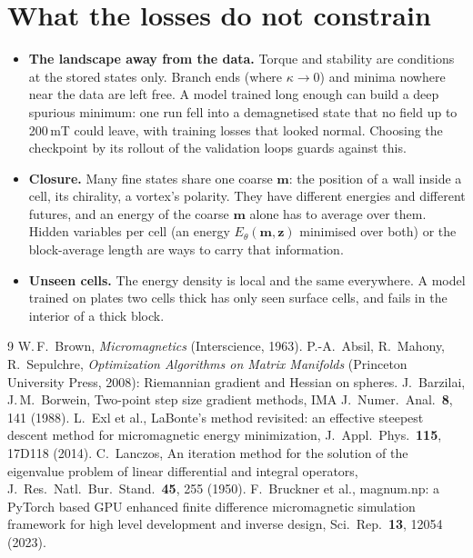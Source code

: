 \documentclass[11pt,a4paper]{article}
\newcommand{\m}{\bm{m}}
\begin{document}
\section{What the losses do not constrain}
\label{sec:limits}

\begin{itemize}
  \item \textbf{The landscape away from the data.} Torque and stability are conditions at the stored
        states only. Branch ends (where $\kappa\to0$) and minima nowhere near the data are left free. A
        model trained long enough can build a deep spurious minimum: one run fell into a demagnetised state
        that no field up to 200\,mT could leave, with training losses that looked normal. Choosing the
        checkpoint by its rollout of the validation loops guards against this.
  \item \textbf{Closure.} Many fine states share one coarse $\m$: the position of a wall inside a cell,
        its chirality, a vortex's polarity. They have different energies and different futures, and an
        energy of the coarse $\m$ alone has to average over them. Hidden variables per cell (an energy
        $E_\theta(\m,\bm z)$ minimised over both) or the block-average length are ways to carry that
        information.
  \item \textbf{Unseen cells.} The energy density is local and the same everywhere. A model trained on
        plates two cells thick has only seen surface cells, and fails in the interior of a thick block.
\end{itemize}

\begin{thebibliography}{9}
 W.\,F.~Brown, \emph{Micromagnetics} (Interscience, 1963).
 P.-A.~Absil, R.~Mahony, R.~Sepulchre, \emph{Optimization Algorithms on Matrix
  Manifolds} (Princeton University Press, 2008): Riemannian gradient and Hessian on spheres.
 J.~Barzilai, J.\,M.~Borwein, Two-point step size gradient methods, IMA J.\ Numer.\ Anal.\
  \textbf{8}, 141 (1988).
 L.~Exl et al., LaBonte's method revisited: an effective steepest descent method for
  micromagnetic energy minimization, J.\ Appl.\ Phys.\ \textbf{115}, 17D118 (2014).
\bibitem{lanczos} C.~Lanczos, An iteration method for the solution of the eigenvalue problem of
  linear differential and integral operators, J.\ Res.\ Natl.\ Bur.\ Stand.\ \textbf{45}, 255 (1950).
\bibitem{magnumnp} F.~Bruckner et al., magnum.np: a PyTorch based GPU enhanced finite difference
  micromagnetic simulation framework for high level development and inverse design, Sci.\ Rep.\
  \textbf{13}, 12054 (2023).
\end{thebibliography}
\end{document}
